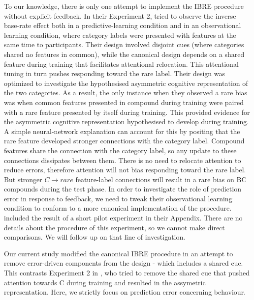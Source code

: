 \documentclass[10pt,letterpaper]{article}
\begin{document}
To our knowledge, there is only one attempt to implement the IBRE procedure without explicit feedback.
In their Experiment 2,  tried to observe the inverse base-rate effect both in a predictive-learning condition and in an observational learning condition, where category labels were presented with features at the same time to participants.
Their design involved disjoint cues (where categories shared no features in common), while the canonical design depends on a shared feature during training that facilitates attentional relocation.
This attentional tuning in turn pushes responding toward the rare label.
Their design was optimized to investigate the hypothesised asymmetric cognitive representation of the two categories.
As a result, the only instance when they observed a rare bias was when common features presented in compound during training were paired with a rare feature presented by itself during training.
This provided evidence for the asymmetric cognitive representation hypothesised to develop during training.
A simple neural-network explanation can account for this by positing that the rare feature developed stronger connections with the category label.
Compound features share the connection with the category label, so any update to these connections dissipates between them.
There is no need to relocate attention to reduce errors, therefore attention will not bias responding toward the rare label.
But stronger $C \to rare$ feature-label connections will result in a rare bias on BC compounds during the test phase.
In order to investigate the role of prediction error in response to feedback, we need to tweak their observational learning condition to conform to a more canonical implementation of the procedure.
 included the result of a short pilot experiment in their Appendix.
There are no details about the procedure of this experiment, so we cannot make direct comparisons.
We will follow up on that line of investigation.

Our current study modified the canonical IBRE procedure in an attempt to remove error-driven components from the design - which includes a shared cue.
This contrasts Experiment 2 in , who tried to remove the shared cue that pushed attention towards C during training and resulted in the assymetric representation.
Here, we strictly focus on prediction error concerning behaviour.
\end{document}
